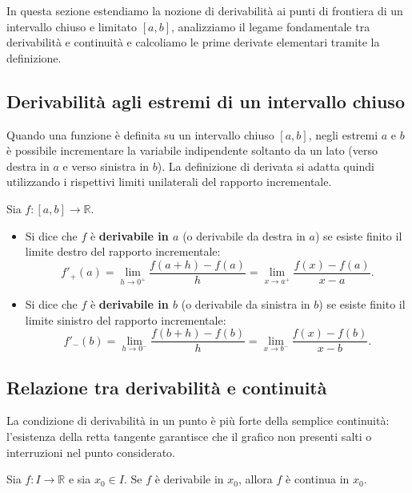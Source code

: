 In questa sezione estendiamo la nozione di derivabilità ai punti di frontiera di un intervallo chiuso e limitato $[a,b]$, analizziamo il legame fondamentale tra derivabilità e continuità e calcoliamo le prime derivate elementari tramite la definizione.

\subsection{Derivabilità agli estremi di un intervallo chiuso}

Quando una funzione è definita su un intervallo chiuso $[a,b]$, negli estremi $a$ e $b$ è possibile incrementare la variabile indipendente soltanto da un lato (verso destra in $a$ e verso sinistra in $b$). La definizione di derivata si adatta quindi utilizzando i rispettivi limiti unilaterali del rapporto incrementale.

\begin{defbox}
Sia $f \colon [a,b] \to \mathbb{R}$.
\begin{itemize}
    \item Si dice che $f$ è \textbf{derivabile in $a$} (o derivabile da destra in $a$) se esiste finito il limite destro del rapporto incrementale:
    \[
        f'_{+}(a) = \lim_{h \to 0^+} \frac{f(a+h) - f(a)}{h} = \lim_{x \to a^+} \frac{f(x) - f(a)}{x - a}.
    \]
    \item Si dice che $f$ è \textbf{derivabile in $b$} (o derivabile da sinistra in $b$) se esiste finito il limite sinistro del rapporto incrementale:
    \[
        f'_{-}(b) = \lim_{h \to 0^-} \frac{f(b+h) - f(b)}{h} = \lim_{x \to b^-} \frac{f(x) - f(b)}{x - b}.
    \]
\end{itemize}
\end{defbox}

\subsection{Relazione tra derivabilità e continuità}

La condizione di derivabilità in un punto è più forte della semplice continuità: l'esistenza della retta tangente garantisce che il grafico non presenti salti o interruzioni nel punto considerato.

\begin{propbox}
Sia $f \colon I \to \mathbb{R}$ e sia $x_0 \in I$. Se $f$ è derivabile in $x_0$, allora $f$ è continua in $x_0$.
\end{propbox}

